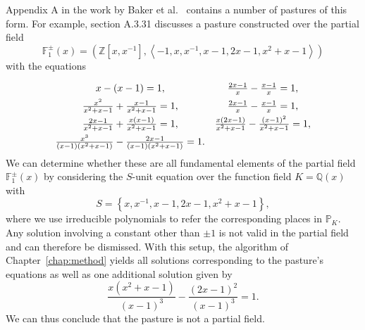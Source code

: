 Appendix A in the work by Baker et al.~\cite{baker-2024-foundations-of-matroids} contains a number of pastures of this form. For example, section A.3.31 discusses a pasture constructed over the partial field
\[\mathbb{F}_{1}^{\pm}(x) = \left( \mathbb{Z} \left[ x, x^{-1} \right], \left\langle -1, x, x^{-1}, x -1, 2x - 1, x^{2} + x - 1 \right\rangle \right)\]
with the equations
\begin{equation*}
  \def\arraystretch{1.5}
  \begin{array}{cc}
    x - (x - 1) = 1,                                                                  & \frac{2x - 1}{x} - \frac{x - 1}{x} = 1,                                    \\
    \frac{x^{2}}{x^{2} + x - 1} + \frac{x - 1}{x^{2} + x - 1} = 1,                    & \frac{2x - 1}{x} - \frac{x - 1}{x} = 1,                                    \\
    \frac{2x - 1}{x^{2} + x - 1} + \frac{x(x - 1)}{x^{2} + x - 1} = 1,                & \frac{x(2x - 1)}{x^{2} + x - 1} - \frac{{(x - 1)}^{2}}{x^{2} + x - 1} = 1, \\
    \frac{x^{3}}{(x - 1)(x^{2} + x - 1)} - \frac{2x - 1}{(x - 1)(x^{2} + x - 1)} = 1. &
  \end{array}
\end{equation*}
We can determine whether these are all fundamental elements of the partial field \(\mathbb{F}_{1}^{\pm}(x)\) by considering the \(S\)-unit equation over the function field \(K = \mathbb{Q}(x)\) with
\[S = \left\{ x, x^{-1}, x -1, 2x - 1, x^{2} + x - 1 \right\},\]
where we use irreducible polynomials to refer the corresponding places in \(\mathbb{P}_{K}\). Any solution involving a constant other than \(\pm 1\) is not valid in the partial field and can therefore be dismissed. With this setup, the algorithm of Chapter~\ref{chap:method} yields all solutions corresponding to the pasture's equations as well as one additional solution given by
\[\frac{x(x^{2} + x - 1)}{{(x - 1)}^{3}} - \frac{{(2x - 1)}^{2}}{{(x - 1)}^{3}} = 1.\]
We can thus conclude that the pasture is not a partial field.
